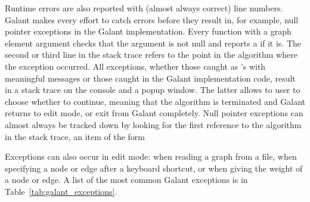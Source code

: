 Runtime errors are also reported with (almost always correct) line
numbers. Galant makes every effort to catch errors before they result in, for
example, null pointer exceptions in the Galant implementation. Every function
with a graph element argument checks that the argument is not null and
reports a  if it is.
The second or third line in the stack trace
refers to the point in the algorithm where the exception occurred.
All exceptions, whether those caught as 's with
meaningful messages or those caught in the Galant implementation code, result
in a stack trace on the console and a popup window.
The latter allows to user to choose whether to continue, meaning that the
algorithm is terminated and Galant returns to edit mode, or exit from Galant
completely.
Null pointer exceptions can almost always be tracked down by looking for the
first reference to the algorithm in the stack trace, an item of the form\\
\hspace*{4em}

Exceptions can also occur in edit mode: when reading a graph from a
file, when specifying a node or edge after a keyboard shortcut, or when
giving the weight of a node or edge.
A list of the most common Galant exceptions is in Table~\ref{tab:galant_exceptions}.

